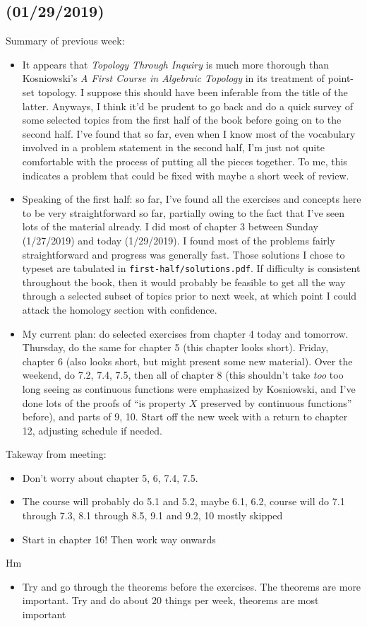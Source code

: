 \documentclass{fkbook}
\begin{document}
\subsection*{(01/29/2019)}
Summary of previous week:
\begin{itemize}
  \item It appears that \emph{Topology Through Inquiry} is much more thorough
    than Kosniowski's \emph{A First Course in Algebraic Topology} in its
    treatment of point-set topology. I suppose this should have been inferable
    from the title of the latter. Anyways, I think it'd be prudent to go back
    and do a quick survey of some selected topics from the first half of the
    book before going on to the second half. I've found that so far, even when
    I know most of the vocabulary involved in a problem statement in the second
    half, I'm just not quite comfortable with the process of putting all the
    pieces together. To me, this indicates a problem that could be fixed with
    maybe a short week of review.

  \item Speaking of the first half: so far, I've found all the exercises and
    concepts here to be very straightforward so far, partially owing to the fact
    that I've seen lots of the material already. I did most of chapter 3 between
    Sunday (1/27/2019) and today (1/29/2019). I found most of the problems
    fairly straightforward and progress was generally fast. Those solutions I
    chose to typeset are tabulated in \texttt{first-half/solutions.pdf}. If
    difficulty is consistent throughout the book, then it would probably be
    feasible to get all the way through a selected subset of topics prior to
    next week, at which point I could attack the homology section with
    confidence.

  \item My current plan: do selected exercises from chapter 4 today and
    tomorrow. Thursday, do the same for chapter 5 (this chapter looks short).
    Friday, chapter 6 (also looks short, but might present some new material).
    Over the weekend, do 7.2, 7.4, 7.5, then all of chapter 8 (this shouldn't
    take \emph{too} too long seeing as continuous functions were emphasized by
    Kosniowski, and I've done lots of the proofs of ``is property $X$ preserved
    by continuous functions'' before), and parts of 9, 10. Start off the new
    week with a return to chapter 12, adjusting schedule if needed.
\end{itemize}
Takeway from meeting:
\begin{itemize}
  \item Don't worry about chapter 5, 6, 7.4, 7.5.
  \item The course will probably do 5.1 and 5.2, maybe 6.1, 6.2, course will do
    7.1 through 7.3, 8.1 through 8.5, 9.1 and 9.2, 10 mostly skipped
  \item Start in chapter 16! Then work way onwards
\end{itemize}
Hm
\begin{itemize}
  \item Try and go through the theorems before the exercises. The theorems are
    more important. Try and do about 20 things per week, theorems are most
    important

\end{itemize}
\mainmatter
\pagestyle{main}


\end{document}
